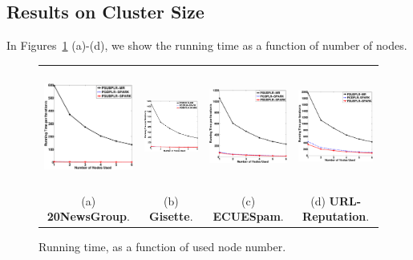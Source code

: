 \documentclass[10pt, conference, compsocconf]{IEEEtran}
\begin{document}
\subsection{Results on Cluster Size}
In Figures~\ref{fig:time} (a)-(d), we show the running time as a function of number of nodes.
%
\begin{figure}[tb]
\begin{center}
\begin{tabular}{cccc}
   \includegraphics[height=3.9cm,width=4.5cm]{img/20NewsGroup_time.eps}&
   \hspace{-0.6cm}\includegraphics[height=3.9cm,width=4.5cm]{img/Gisette_time.eps}&
   \hspace{-0.6cm}\includegraphics[height=3.9cm,width=4.5cm]{img/ECUESpam_time.eps}&
   \hspace{-0.6cm}\includegraphics[height=3.9cm,width=4.5cm]{img/URL-Reputation_time.eps}\\
   (a) \textbf{20NewsGroup}. & \hspace{-0.3cm}(b) \textbf{Gisette}. & \hspace{-0.3cm}(c) \textbf{ECUESpam}. & \hspace{-0.3cm}(d) \textbf{URL-Reputation}.\\
   \end{tabular}
\end{center}\vspace{-0.3cm}
   \caption{Running time, as a function of used node number.}\vspace{-0.5cm}
\label{fig:time}
\end{figure}
\end{document}
